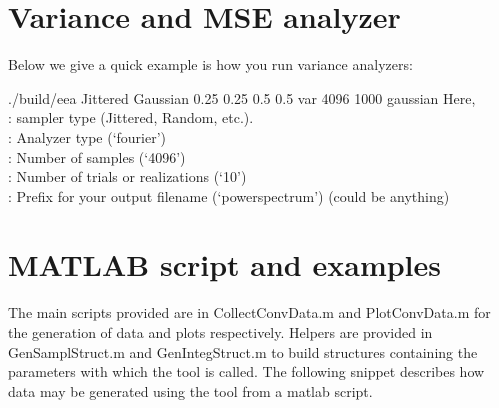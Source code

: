 \section{Variance and MSE analyzer}
\label{sec:erranalyzer}
Below we give a quick example is how you run variance analyzers:

%
\begin{tcolorbox}
./build/eea   Jittered   Gaussian  0.25 0.25  0.5 0.5   var  4096  1000    gaussian
\tcblower
Here, \\
: sampler type (Jittered, Random, etc.). \\
:  Analyzer type (`fourier') \\
: Number of samples (`4096') \\
: Number of trials or realizations (`10') \\
: Prefix for your output filename (`powerspectrum') (could be anything)
\end{tcolorbox}
%


\section{MATLAB script and examples}
\label{sec:matlab}
The main scripts provided are in CollectConvData.m and PlotConvData.m for the generation of data and plots respectively. Helpers are provided in GenSamplStruct.m  and GenIntegStruct.m to build structures containing the parameters with which the tool is called. The following snippet describes how data may be generated using the tool from a matlab script. 
